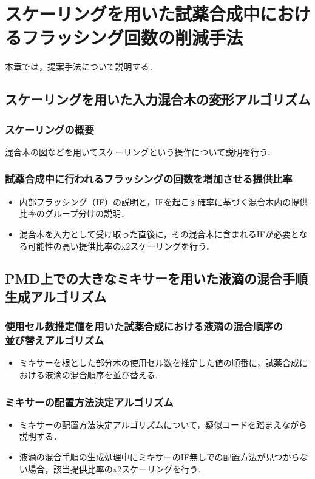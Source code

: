 \chapter{スケーリングを用いた試薬合成中におけるフラッシング回数の削減手法}
本章では，提案手法について説明する．

\section{スケーリングを用いた入力混合木の変形アルゴリズム}
\subsection{スケーリングの概要}
混合木の図などを用いてスケーリングという操作について説明を行う．
\subsection{試薬合成中に行われるフラッシングの回数を増加させる提供比率}
\begin{itemize}
\item 内部フラッシング（IF）の説明と，IFを起こす確率に基づく混合木内の提供比率のグループ分けの説明\cite{1}\cite{2}．
\item 混合木を入力として受け取った直後に，その混合木に含まれるIFが必要となる可能性の高い提供比率のx2スケーリングを行う．
\end{itemize}
\section{PMD上での大きなミキサーを用いた液滴の混合手順生成アルゴリズム}
\subsection{使用セル数推定値を用いた試薬合成における液滴の混合順序の\\並び替えアルゴリズム}
\begin{itemize}
\item ミキサーを根とした部分木の使用セル数を推定した値の順番に，試薬合成における液滴の混合順序を並び替える.
\end{itemize}
\subsection{ミキサーの配置方法決定アルゴリズム}
\begin{itemize}
\item ミキサーの配置方法決定アルゴリズムについて，疑似コードを踏まえながら説明する．
\item 液滴の混合手順の生成処理中にミキサーのIF無しでの配置方法が見つからない場合，該当提供比率のx2スケーリングを行う.
\end{itemize}
